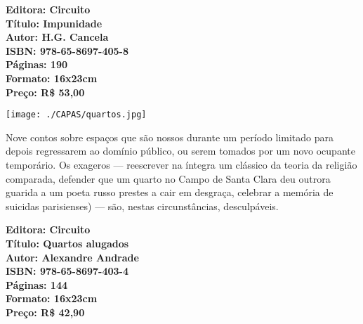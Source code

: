 \hspace*{-.4cm}\begin{minipage}[c]{1\linewidth}
\small\textbf{
\hspace*{-.1cm}Editora: Circuito\\
Título: Impunidade\\
Autor: H.G. Cancela\\ 
ISBN: 978-65-8697-405-8\\
Páginas: 190\\
Formato: 16x23cm\\
Preço: R\$ 53,00\\
}
\end{minipage}

\pagebreak

\begin{center}
\hspace*{.5cm}\texttt{[image: ./CAPAS/quartos.jpg]}
\end{center}

\hspace*{-7cm}\hrulefill\hspace*{-7cm}

\medskip

\noindent{}Nove contos sobre espaços que são nossos durante um período limitado para depois	regressarem ao domínio público, ou serem tomados por um novo ocupante temporário.
 Os exageros
--- reescrever na íntegra um clássico da teoria da religião comparada, defender que um
quarto no Campo de Santa Clara deu outrora guarida a um poeta russo prestes a cair
em desgraça, celebrar a memória de suicidas parisienses) --- são, nestas circunstâncias,
desculpáveis.


\vfill

\hspace*{-.4cm}\begin{minipage}[c]{1\linewidth}
\small\textbf{
\hspace*{-.1cm}Editora: Circuito\\
Título: Quartos alugados\\
Autor: Alexandre Andrade\\ 
ISBN: 978-65-8697-403-4\\
Páginas: 144\\
Formato: 16x23cm\\
Preço: R\$ 42,90\\
}
\end{minipage}



